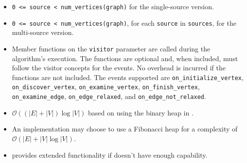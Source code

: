 \begin{itemdescr}
      \hardprecond
            \begin{itemize}
                  \item
                        \lstinline{0 <= source < num_vertices(graph)} for the single-source version.
                  \item
                        \lstinline{0 <= source < num_vertices(graph)}, for each \lstinline{source} in \lstinline{sources}, 
                                   for the multi-source version.
            \end{itemize}
      \pnum\effects
            \begin{itemize}
                  \item Member functions on the \lstinline{visitor} parameter are called during the algorithm's execution.
                        The functions are optional and, when included, must follow the visitor concepts for the events.
                        No overhead is incurred if the functions are not included.
                        The events supported are \lstinline{on_initialize_vertex}, \lstinline{on_discover_vertex},
                        \lstinline{on_examine_vertex}, \lstinline{on_finish_vertex}, \lstinline{on_examine_edge},
                        \lstinline{on_edge_relaxed}, and \lstinline{on_edge_not_relaxed}.
            \end{itemize}
      \pnum\complexity
            \begin{itemize}
                  \item $\mathcal{O}((|E| + |V|)\log{|V|})$ based on using the binary heap in .
                  \item An implementation may choose to use a Fibonacci heap for a complexity of $\mathcal{O}(|E| + |V|\log{|V|})$.
            \end{itemize}
      \pnum\remarks 
            \begin{itemize}
                  \item {} provides extended functionality if  doesn't have
                         enough capability.
            \end{itemize}
\end{itemdescr}





